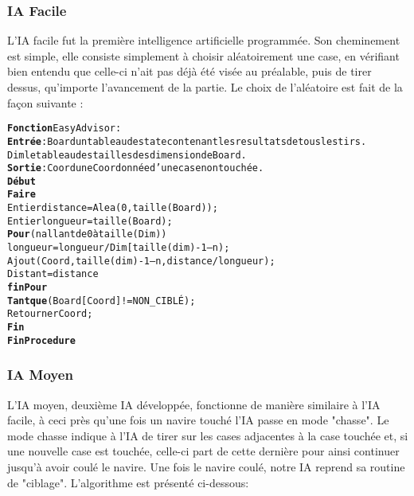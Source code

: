 \subsubsection{IA Facile}
    L'IA facile fut la première intelligence artificielle programmée. Son cheminement est simple, elle consiste simplement à choisir aléatoirement une case, en vérifiant bien entendu que celle-ci n'ait pas déjà été visée au préalable, puis de tirer dessus, qu'importe l'avancement de la partie.\newline
    Le choix de l'aléatoire est fait de la façon suivante :\newline
    
\begin{alltt}
{\bf Fonction} EasyAdvisor :
	{\bf Entrée} : Board un tableau de state contenant les resultats de tous les tirs.
          Dim le tableau des tailles des dimension de Board.
    {\bf Sortie} : Coord une Coordonnée d’une case non touchée.
    {\bf Début}
        {\bf Faire}
            Entier distance = Alea(0, taille(Board)) ;
            Entier longueur = taille(Board) ;
            {\bf Pour} (n allant de 0 à taille(Dim))
                longueur = longueur / Dim[taille(dim) - 1 – n) ;
                Ajout(Coord, taille(dim) - 1 – n, distance / longueur) ;
                Distant = distance % longueur
            {\bf finPour}
        {\bf Tant que} (Board[Coord] != NON_CIBLÉ) ;
        Retourner Coord ;
    {\bf Fin}
{\bf Fin Procedure} 
\end{alltt}
        
\newpage        
        
\subsubsection{IA Moyen}
	L'IA moyen, deuxième IA développée, fonctionne de manière similaire à l'IA facile, à ceci près qu'une fois un navire touché l'IA passe en mode "chasse".\newline
	Le mode chasse indique à l'IA de tirer sur les cases adjacentes à la case touchée et, si une nouvelle case est touchée, celle-ci part de cette dernière pour ainsi continuer jusqu'à avoir coulé le navire.\newline
	Une fois le navire coulé, notre IA reprend sa routine de "ciblage".\newline
	L'algorithme est présenté ci-dessous:
    

